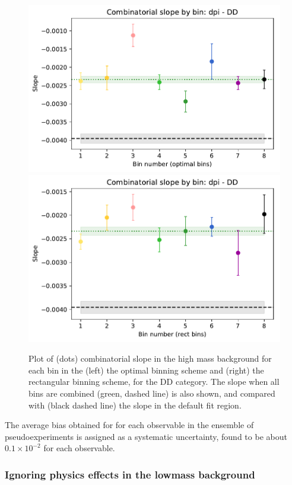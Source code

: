 \begin{figure}[tbp]
    \centering
    \includegraphics[width=0.4\columnwidth]{figures/analysis/systematics/comb_slopes/com_slopes_by_bin_dpi_DD.pdf}
    \includegraphics[width=0.4\columnwidth]{figures/analysis/systematics/comb_slopes/com_slopes_by_bin_dpi_DD_rect.pdf}
    \caption{Plot of (dots) combinatorial slope in the high \B mass background for each bin in the (left) the optimal binning scheme and (right) the rectangular binning scheme, for the DD \BtoDpiDtoKspipi category. The slope when all bins are combined (green, dashed line) is also shown, and compared with (black dashed line) the slope in the default fit region. }
    \label{fig:comb_sloped_single_channel}
\end{figure}




The average bias obtained for for each observable in the ensemble of pseudoexperiments is assigned as a systematic uncertainty, found to be about $0.1\times 10^{-2}$ for each observable. 


\subsubsection{Ignoring physics effects in the lowmass background} %
\label{ssub:using_the_same_part_reco_shape_in_all_dalitz_bins_ignoring_physics_effects_in_the_lowmass_background}

